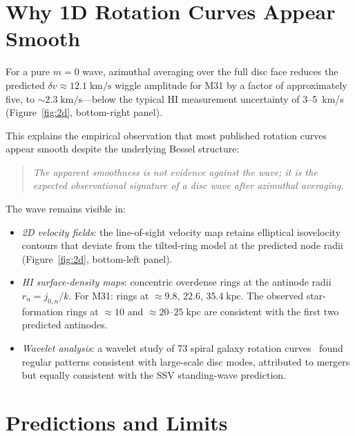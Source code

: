 \documentclass[11pt,a4paper]{article}
\begin{document}
\section{Why 1D Rotation Curves Appear Smooth}
\label{sec:smooth}

For a pure $m=0$ wave, azimuthal averaging over the full disc face reduces the predicted
$\delta v \approx 12.1\;\mathrm{km/s}$ wiggle amplitude for M31 by a factor of
approximately five, to $\sim2.3\;\mathrm{km/s}$---below the typical HI measurement
uncertainty of 3--5~km/s (Figure~\ref{fig:2d}, bottom-right panel).

This explains the empirical observation that most published rotation curves appear smooth
despite the underlying Bessel structure:
\begin{quote}
  \emph{The apparent smoothness is not evidence against the wave; it is the expected
  observational signature of a disc wave after azimuthal averaging.}
\end{quote}

The wave remains visible in:
\begin{itemize}
  \item \emph{2D velocity fields}: the line-of-sight velocity map retains elliptical
    isovelocity contours that deviate from the tilted-ring model at the predicted node
    radii (Figure~\ref{fig:2d}, bottom-left panel).
  \item \emph{HI surface-density maps}: concentric overdense rings at the antinode radii
    $r_n = j_{0,n}/k$.  For M31: rings at $\approx9.8$, $22.6$, $35.4\;\mathrm{kpc}$.
    The observed star-formation rings at $\approx10$ and $\approx20$--$25\;\mathrm{kpc}$
    are consistent with the first two predicted antinodes.
  \item \emph{Wavelet analysis}: a wavelet study of 73 spiral galaxy rotation
    curves~\cite{kuassivi2011} found regular patterns consistent with large-scale disc
    modes, attributed to mergers but equally consistent with the SSV standing-wave
    prediction.
\end{itemize}

\section{Predictions and Limits}
\label{sec:predictions}
\end{document}
